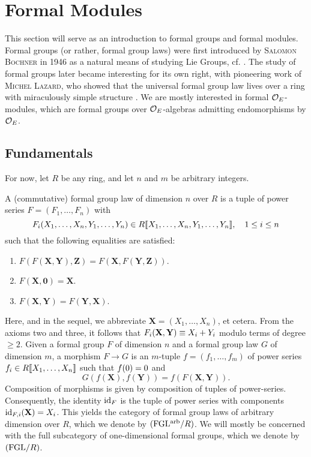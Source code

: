 \documentclass[../main.tex]{subfiles}
\begin{document}
\section{Formal Modules}
This section will serve as an introduction to formal groups and 
formal modules. Formal groups (or rather, formal group laws) were first
introduced by \textsc{Salomon Bochner} in 1946 as a natural means of studying Lie
Groups, cf. \cite{Bochner1946FGrps}. The study of formal groups later became
interesting for its own right, with pioneering work of \textsc{Michel Lazard}, who 
showed that the universal formal group law
lives over a ring with miraculously simple structure \cite{Lazard1955FGrps}. 
We are mostly interested in formal $\mathcal{O}_E$-modules, which are formal groups
over $\mathcal{O}_E$-algebras admitting endomorphisms by $\mathcal{O}_E$.

\subsection{Fundamentals} %
\label{sub:Basic Notions}
For now, let $R$ be any ring, and let $n$ and $m$ be arbitrary integers.
\begin{defi}
  A (commutative) formal group law  of dimension
  $n$ over $R$ is a tuple of
  power series $F = (F_1, \dots, F_n)$ with $$F_i(X_1, \dots, X_n,Y_1,
  \dots, Y_n) \in R\llbracket X_1, \dots,
  X_n, Y_1, \dots, Y_n\rrbracket, \quad 1 \leq i \leq n$$
  such that  the following equalities are satisfied:
  \begin{enumerate}
    \item $F(F (\mathbf X, \mathbf Y), \mathbf Z) = 
      F(\mathbf X, F(\mathbf Y, \mathbf Z))$.
    \item $F( \mathbf X, \mathbf 0) = \mathbf X$.
    \item $F( \mathbf X, \mathbf Y) = F(\mathbf Y, \mathbf X).$
  \end{enumerate}
  Here, and in the sequel, we abbreviate $\mathbf X =
  (X_1, \dots, X_n)$, et cetera. From the axioms two and three, it follows that 
  $F_i(\mathbf{X}, \mathbf{Y}) \equiv X_i + Y_i$ modulo terms of degree $\geq 2$.
  Given a formal group $F$ of dimension $n$ and a formal group law
  $G$ of dimension $m$,
  a morphism $F \to G$ is an $m$-tuple $f = (f_1, \dots, f_m)$ 
  of power series $f_i \in R\llbracket X_1, \dots, X_n \rrbracket$ such that ${f}(0)=0$ and
  \begin{equation*}
    G(f( \mathbf X), f( \mathbf Y) ) = f(F( \mathbf X, \mathbf Y)).
  \end{equation*}
  Composition of morphisms is given by composition of tuples of power-series. 
  Consequently, the identity $\operatorname{id}_{F}$ is the tuple of power series with
  components $\operatorname{id}_{F,i}( \mathbf X) = X_i$. 
  This yields the category of formal group laws of arbitrary dimension over $R$,
  which we denote by ${(\mathrm{FGL^{arb}}/{R})}$. We will mostly be concerned with the full
  subcategory of one-dimensional formal groups, which we denote by ${(\mathrm{FGL}/{R})}$. 
\end{defi}
\end{document}
